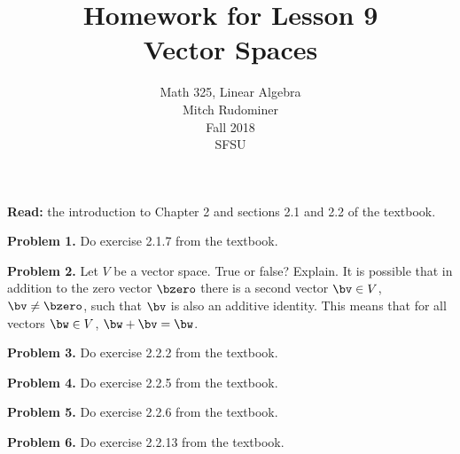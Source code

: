 \documentclass[oneside,12pt]{amsart}
\begin{document}
\title{Homework for Lesson 9 \\ Vector Spaces}
\author{Math 325, Linear Algebra \\ Mitch Rudominer \\ Fall 2018 \\ SFSU }
\date{}

\maketitle

\textbf{Read:} the introduction to Chapter 2 and sections 2.1 and 2.2 of the textbook.

\bigskip

\textbf{Problem 1.} Do exercise 2.1.7 from the textbook.

\bigskip
\bigskip
\bigskip
\bigskip
\bigskip
\bigskip
\bigskip
\bigskip

\textbf{Problem 2.} Let $V$ be a vector space. True or false? Explain. It is possible
that in addition to the zero vector $\bzero$ there is a second vector $\bv\in V$,
$\bv\not=\bzero$,
such that $\bv$ is also an additive identity. This means that for all
vectors $\bw\in V$, $\bw + \bv = \bw$.

\bigskip
\bigskip
\bigskip
\bigskip
\bigskip

\textbf{Problem 3.} Do exercise 2.2.2 from the textbook.

\bigskip
\bigskip
\bigskip
\bigskip
\bigskip
\bigskip
\bigskip
\bigskip
\bigskip
\bigskip

\textbf{Problem 4.} Do exercise 2.2.5 from the textbook.

\bigskip
\bigskip
\bigskip

\textbf{Problem 5.} Do exercise 2.2.6 from the textbook.

\bigskip
\bigskip
\bigskip
\bigskip
\bigskip
\bigskip
\bigskip

\textbf{Problem 6.} Do exercise 2.2.13 from the textbook.

\bigskip
\bigskip
\bigskip
\bigskip
\bigskip
\bigskip
\bigskip
\end{document}
